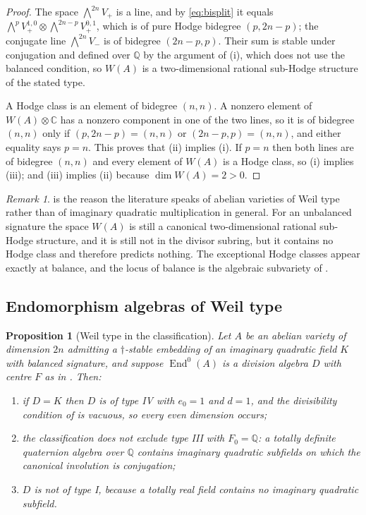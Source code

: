 \documentclass[11pt,reqno]{amsart}
\theoremstyle{plain}
\newtheorem{proposition}[theorem]{Proposition}
\theoremstyle{definition}
\theoremstyle{remark}
\newtheorem{remark}[theorem]{Remark}
\newcommand{\QQ}{\mathbb{Q}}
\newcommand{\CC}{\mathbb{C}}
\newcommand{\HW}{W}                      %
\DeclareMathOperator{\End}{End}
\begin{document}
\begin{proof}
The space $\bigwedge^{2n}V_{+}$ is a line, and by \eqref{eq:bisplit} it equals
$\bigwedge^{p}V^{1,0}_{+}\otimes\bigwedge^{2n-p}V^{0,1}_{+}$, which is of pure
Hodge bidegree $(p,2n-p)$; the conjugate line $\bigwedge^{2n}V_{-}$ is of
bidegree $(2n-p,p)$. Their sum is stable under conjugation and defined over
$\QQ$ by the argument of (i), which does not use the
balanced condition, so $\HW(A)$ is a two-dimensional rational sub-Hodge
structure of the stated type.

A Hodge class is an element of bidegree $(n,n)$. A nonzero element of
$\HW(A)\otimes\CC$ has a nonzero component in one of the two lines, so it is of
bidegree $(n,n)$ only if $(p,2n-p)=(n,n)$ or $(2n-p,p)=(n,n)$, and either
equality says $p=n$. This proves that (ii) implies (i). If $p=n$ then both
lines are of bidegree $(n,n)$ and every element of $\HW(A)$ is a Hodge class,
so (i) implies (iii); and (iii) implies (ii) because $\dim\HW(A)=2>0$.
\end{proof}

\begin{remark}\label{rem:onlybalanced}
 is the reason the literature speaks of abelian
varieties of Weil type rather than of imaginary quadratic multiplication in
general. For an unbalanced signature the space $\HW(A)$ is still a canonical
two-dimensional rational sub-Hodge structure, and it is still not in the
divisor subring, but it contains no Hodge class and therefore predicts
nothing. The exceptional Hodge classes appear exactly at balance, and the
locus of balance is the algebraic subvariety of .
\end{remark}

\subsection{Endomorphism algebras of Weil type}

\begin{proposition}[Weil type in the classification]\label{prop:whichtypes}
Let $A$ be an abelian variety of dimension $2n$ admitting a $\dagger$-stable
embedding of an imaginary quadratic field $K$ with balanced signature, and
suppose $\End^{0}(A)$ is a division algebra $D$ with centre $F$ as in
. Then:
\begin{enumerate}[label=\textup{(\roman*)},nosep]
\item if $D=K$ then $D$ is of type IV with $e_{0}=1$ and $d=1$, and the
  divisibility condition of  is vacuous, so every even
  dimension occurs;
\item the classification does not exclude type III with $F_{0}=\QQ$: a
  totally definite quaternion algebra over $\QQ$ contains imaginary
  quadratic subfields on which the canonical involution is conjugation;
\item $D$ is not of type I, because a totally real field contains no
  imaginary quadratic subfield.
\end{enumerate}
\end{proposition}
\end{document}
